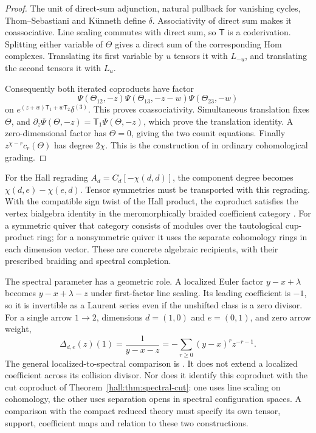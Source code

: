 \begin{proof}
The unit of direct-sum adjunction, natural pullback for vanishing
cycles, Thom--Sebastiani and K\"unneth define $\delta$.
Associativity of direct sum makes it coassociative. Line scaling
commutes with direct sum, so $\mathsf T$ is a coderivation.
Splitting either variable of $\Theta$ gives a direct sum of
the corresponding Hom complexes. Translating its first variable
by $u$ tensors it with $L_{-u}$, and translating the second
tensors it with $L_u$.

Consequently both iterated coproducts have factor
\[
 \Psi(\Theta_{12},-z)\Psi(\Theta_{13},-z-w)
                  \Psi(\Theta_{23},-w)
\]
on $e^{(z+w)\mathsf T_1+w\mathsf T_2}\delta^{(3)}$.
This proves coassociativity. Simultaneous translation fixes
$\Theta$, and
$\partial_z\Psi(\Theta,-z)=\mathsf T_1\Psi(\Theta,-z)$,
which prove the translation identity. A zero-dimensional
factor has $\Theta=0$, giving the two counit equations.
Finally $z^{\chi-r}c_r(\Theta)$ has degree $2\chi$.
This is the construction of
\cite[Theorem~2.3.1]{JindalKaubrysLatyntsev} in ordinary
cohomological grading.
\end{proof}

For the Hall regrading $A_d=C_d[-\chi(d,d)]$, the component
degree becomes $\chi(d,e)-\chi(e,d)$. Tensor symmetries must
be transported with this regrading. With the compatible sign
twist of the Hall product, the coproduct satisfies the vertex
bialgebra identity in the meromorphically braided coefficient
category \cite[Theorems~4.5.2 and~4.5.5]{JindalKaubrysLatyntsev}.
For a symmetric quiver that category consists of modules over
the tautological cup-product ring; for a nonsymmetric quiver
it uses the separate cohomology rings in each dimension vector.
These are concrete algebraic recipients, with their prescribed
braiding and spectral completion.

The spectral parameter has a geometric role. A localized Euler
factor $y-x+\lambda$ becomes $y-x+\lambda-z$ under first-factor
line scaling. Its leading coefficient is $-1$, so it is
invertible as a Laurent series even if the unshifted class is
a zero divisor. For a single arrow $1\to2$, dimensions
$d=(1,0)$ and $e=(0,1)$, and zero arrow weight,
\[
 \Delta_{d,e}(z)(1)=\frac1{y-x-z}
       =-\sum_{r\geq0}(y-x)^r z^{-r-1}.
\]
The general localized-to-spectral comparison is
\cite[Theorem~3.3.2]{JindalKaubrysLatyntsev}.
It does not extend a localized coefficient across its
collision divisor. Nor does it identify this coproduct with
the cut coproduct of Theorem~\ref{hall:thm:spectral-cut}:
one uses line scaling on cohomology, the other uses separation
opens in spectral configuration spaces. A comparison with the
compact reduced theory must specify its own tensor, support,
coefficient maps and relation to these two constructions.

